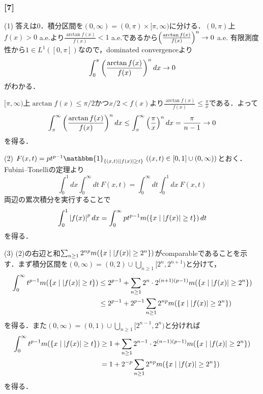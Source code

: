 \documentclass[a4j]{ltjsarticle}
\newcommand{\1}{\mathbbm{1}}
\numberwithin{equation}{section}
\theoremstyle{definition}
\begin{document}
\subsubsection*{[7]}
(1) 答えは0．積分区間を$(0,\infty)=(0,\pi)\times[\pi,\infty)$に分ける．$(0,\pi)$上$f(x)>0$ a.e.より$\frac{\arctan f(x)}{f(x)}<1$ a.e.であるから$\qty(\frac{\arctan f(x)}{f(x)})^n\to0$ a.e. 有限測度性から$1\in L^1([0,\pi])$なので，dominated convergenceより
\begin{equation}
    \int_{0}^{\pi}\qty(\frac{\arctan f(x)}{f(x)})^n\,dx\to0 
\end{equation}
がわかる．

$[\pi,\infty)$上$\arctan f(x)\leq \pi/2$かつ$x/2<f(x)$より$\frac{\arctan f(x)}{f(x)}\leq \frac{\pi}{x}$である．よって
\begin{equation}
    \int_{\pi}^{\infty}\qty(\frac{\arctan f(x)}{f(x)})^n\,dx\leq\int_{\pi}^{\infty}\qty(\frac{\pi}{x})^n\,dx=\frac{\pi}{n-1}\to0
\end{equation}
を得る．

(2) $F(x,t)=pt^{p-1}\1_{\qty{(x,t)\mid \abs{f(x)}\geq t}}\ ((x,t)\in [0,1]\cup(0,\infty))$とおく．Fubini--Tonelliの定理より
\begin{equation}
    \int_{0}^{1}dx\int_{0}^{\infty}dt\ F(x,t)=\int_{0}^{\infty}dt\int_{0}^{1}dx\ F(x,t)
\end{equation}
両辺の累次積分を実行することで
\begin{equation}
    \int_{0}^{1}\abs{f(x)}^p\,dx=\int_{0}^{\infty}pt^{p-1}m(\qty{x\mid \abs{f(x)}\geq t})\,dt
\end{equation}
を得る．

(3) (2)の右辺と和$\sum_{n\geq 1}2^{np}m(\qty{x\mid \abs{f(x)}\geq 2^n})$がcomparableであることを示す．まず積分区間を$(0,\infty)=(0,2)\cup\bigcup_{n\geq 1}[2^n,2^{n+1})$と分けて，
\begin{align}
    \int_{0}^{\infty}t^{p-1}m(\qty{x\mid \abs{f(x)}\geq t})&\leq 2^{p-1}+\sum_{n\geq 1}2^n\cdot 2^{(n+1)(p-1)}m\qty(\qty{x\mid \abs{f(x)}\geq 2^n})\\
    &\leq 2^{p-1}+2^{p-1}\sum_{n\geq 1}2^{np}m(\qty{x\mid \abs{f(x)}\geq 2^n})
\end{align}
を得る．また$(0,\infty)=(0,1)\cup\bigcup_{n\geq 1}[2^{n-1},2^n)$と分ければ
\begin{align}
    \int_{0}^{\infty}t^{p-1}m(\qty{x\mid \abs{f(x)}\geq t})&\geq 1+\sum_{n\geq 1}2^{n-1}\cdot 2^{(n-1)(p-1)}m(\qty{x\mid \abs{f(x)}\geq 2^n})\\
    &=1+2^{-p}\sum_{n\geq 1}2^{np}m(\qty{x\mid \abs{f(x)}\geq 2^n})
\end{align}
を得る．
\end{document}
